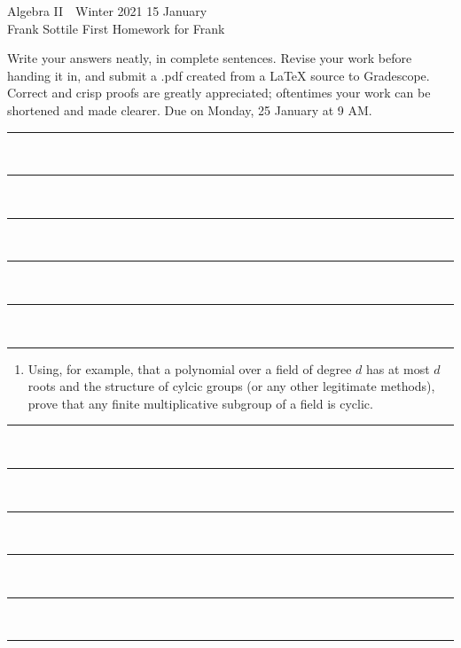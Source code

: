 \documentclass[12pt]{article}
\newcommand{\barsl}{\noindent\begin{minipage}[t]{575pt}
{\color{violet}\rule{575pt}{1.2pt}}\vspace{-5.7mm}\\
{\color{blue}\rule{575pt}{1.2pt}}\vspace{-5.7mm}\\
{\color{green}\rule{575pt}{1.2pt}}\vspace{-5.7mm}\\
{\color{yellow}\rule{575pt}{1.2pt}}\vspace{-5.7mm}\\
{\color{orange}\rule{575pt}{1.2pt}}\vspace{-5.7mm}\\
{\color{red}\rule{575pt}{1.2pt}}
\end{minipage}}
\begin{document}
\LARGE 
\noindent
Algebra II\ \ Winter 2021 \hfill 15 January\makebox[40pt][l]{\ }\\
Frank Sottile \hfill
\Large\sf
First Homework for Frank\makebox[40pt][l]{\ }\\
\large\vspace{5pt}

\noindent
Write your answers neatly, in complete sentences.  
Revise your work before handing it in, and submit a .pdf  created from a LaTeX source to Gradescope.
Correct and crisp proofs are greatly appreciated; oftentimes your work can be shortened and made clearer.\newline
Due on Monday, 25 January at 9 AM.
\vspace{-5pt}

%
\barsl\vspace{2pt}

\noindent{\color{brown}{\large\sf For Frank to grade:}}

\begin{enumerate}


\item Using, for example, that a polynomial over a field of degree $d$ has at most $d$ roots and the structure of cylcic
  groups (or any other legitimate methods), prove that any finite multiplicative subgroup of a field is cyclic.

\end{enumerate}

\barsl
\end{document}

